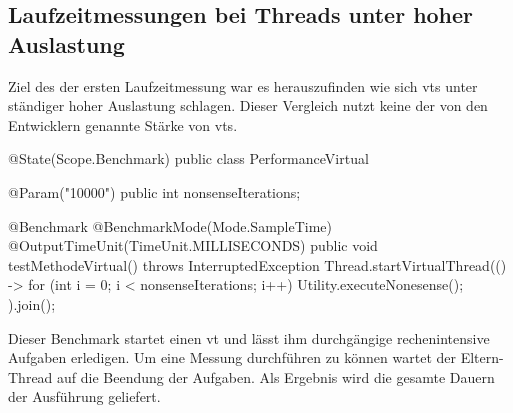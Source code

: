 \subsection{Laufzeitmessungen bei Threads unter hoher Auslastung}                                         
\label{subsec:LaufzeitmessungenbeiThreadsunterhoherAuslastung}

    Ziel des der ersten Laufzeitmessung war es herauszufinden wie sich \Glspl{vt} unter ständiger hoher Auslastung schlagen. Dieser Vergleich nutzt keine der von den Entwicklern genannte 
    Stärke von \Glspl{vt}.
    \begin{program} [H]
        \caption{Benchmark eines \Glspl{vt} unter hoher Auslastung}
        \label{prog:BenchmarkEinesVTUnterHoherAuslastung}
    \begin{JavaCode}[language=Java, numbers=left]
        @State(Scope.Benchmark)
public class PerformanceVirtual {

    @Param("10000")
    public int nonsenseIterations;

    @Benchmark
    @BenchmarkMode(Mode.SampleTime)
    @OutputTimeUnit(TimeUnit.MILLISECONDS)
    public void testMethodeVirtual() throws InterruptedException {
        Thread.startVirtualThread(() -> {
            for (int i = 0; i < nonsenseIterations; i++)
                Utility.executeNonesense();
        }).join();
    }
}\end{JavaCode}
    \end{program}
    Dieser Benchmark startet einen \gls{vt} und lässt ihm durchgängige rechenintensive Aufgaben erledigen. Um eine Messung durchführen zu können wartet der Eltern-Thread auf die Beendung der Aufgaben.
    Als Ergebnis wird die gesamte Dauern der Ausführung geliefert. 
